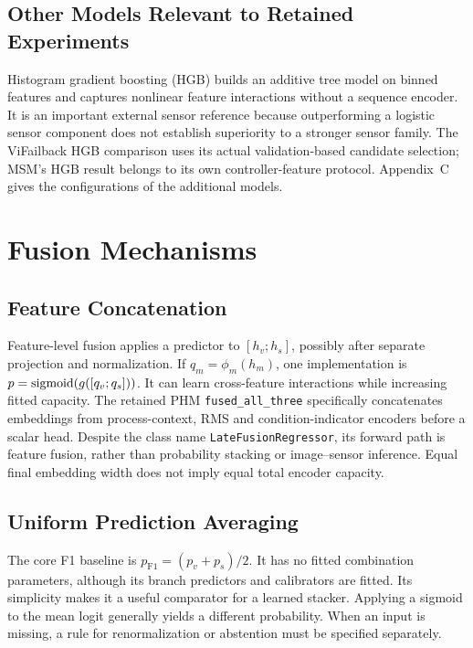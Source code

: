 \subsection{Other Models Relevant to Retained Experiments}
Histogram gradient boosting (HGB) builds an additive tree model on binned features and captures nonlinear feature interactions without a sequence encoder. It is an important external sensor reference because outperforming a logistic sensor component does not establish superiority to a stronger sensor family. The ViFailback HGB comparison uses its actual validation-based candidate selection; MSM's HGB result belongs to its own controller-feature protocol. Appendix~C gives the configurations of the additional models.

\section{Fusion Mechanisms}
\subsection{Feature Concatenation}
Feature-level fusion applies a predictor to $[h_v;h_s]$, possibly after separate projection and normalization. If $q_m=\phi_m(h_m)$, one implementation is $p=\operatorname{sigmoid}(g([q_v;q_s]))$. It can learn cross-feature interactions while increasing fitted capacity. The retained PHM \texttt{fused\_all\_three} specifically concatenates embeddings from process-context, RMS and condition-indicator encoders before a scalar head. Despite the class name \texttt{LateFusionRegressor}, its forward path is feature fusion, rather than probability stacking or image--sensor inference. Equal final embedding width does not imply equal total encoder capacity.

\subsection{Uniform Prediction Averaging}
The core F1 baseline is $p_{\mathrm{F1}}=(p_v+p_s)/2$. It has no fitted combination parameters, although its branch predictors and calibrators are fitted. Its simplicity makes it a useful comparator for a learned stacker. Applying a sigmoid to the mean logit generally yields a different probability. When an input is missing, a rule for renormalization or abstention must be specified separately.

